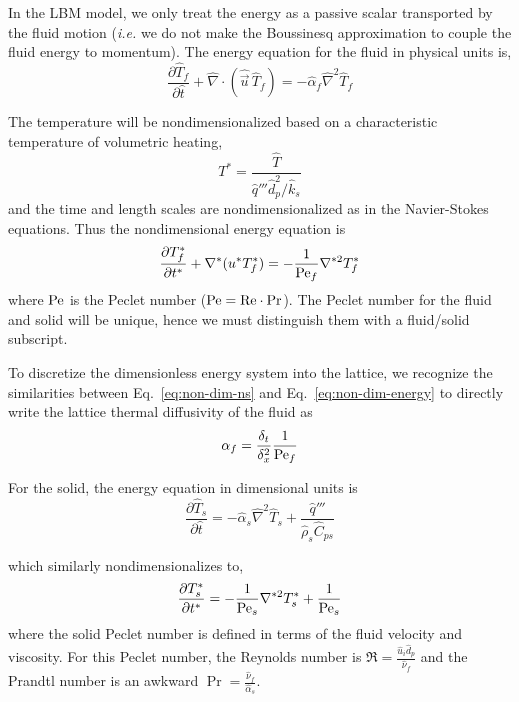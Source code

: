 In the LBM model, we only treat the energy as a passive scalar transported by the fluid motion (\textit{i.e.} we do not make the Boussinesq approximation to couple the fluid energy to momentum). The energy equation for the fluid in physical units is,
\begin{equation}
	\frac{\partial \hat{T}_f}{\partial \hat{t}} + \hat{\nabla}\cdot(\hat{\vec{u}}\,\hat{T}_f) = -\hat{\alpha}_f\hat{\nabla}^2\hat{T}_f
\end{equation}

The temperature will be nondimensionalized based on a characteristic temperature of volumetric heating,
\begin{equation}
	T^* = \frac{\hat{T}}{\hat{q}''' \hat{d}_p^2/\hat{k}_s}
\end{equation}
and the time and length scales are nondimensionalized as in the Navier-Stokes equations. Thus the nondimensional energy equation is
\begin{equation}\label{eq:non-dim-energy}
	\frac{\partial T^*_f}{\partial t^*} + \nabla^*(u^*T^*_f) = -\frac{1}{\mathrm{Pe}_f} \nabla^{*2}T^*_f
\end{equation}
where $\mathrm{Pe}$ is the Peclet number ($\mathrm{Pe} = \mathrm{Re}\cdot \mathrm{Pr}$). The Peclet number for the fluid and solid will be unique, hence we must distinguish them with a fluid/solid subscript.

To discretize the dimensionless energy system into the lattice, we recognize the similarities between Eq.~\ref{eq:non-dim-ns} and Eq.~\ref{eq:non-dim-energy} to directly write the lattice thermal diffusivity of the fluid as
\begin{equation}
	\alpha_f = \frac{\delta_t}{\delta_x^2}\frac{1}{\mathrm{Pe}_f}
\end{equation}

For the solid, the energy equation in dimensional units is
\begin{equation}
	\frac{\partial \hat{T}_s}{\partial \hat{t}} = -\hat{\alpha}_s\hat{\nabla}^2\hat{T}_s + \frac{\hat{q}'''}{\hat{\rho}_s\hat{C}_{ps}}
\end{equation}

which similarly nondimensionalizes to,
\begin{equation}\label{eq:non-dim-energy-solid}
	\frac{\partial T^*_s}{\partial t^*} = -\frac{1}{\mathrm{Pe}_s} \nabla^{*2}T^*_s + \frac{1}{\mathrm{Pe}_s}
\end{equation}
where the solid Peclet number is defined in terms of the fluid velocity and viscosity. For this Peclet number, the Reynolds number is $\Re = \frac{\hat{u}_i \hat{d}_p}{\hat{\nu}_f}$ and the Prandtl number is an awkward $\Pr = \frac{\hat{\nu}_f}{\hat{\alpha}_s}$. 

